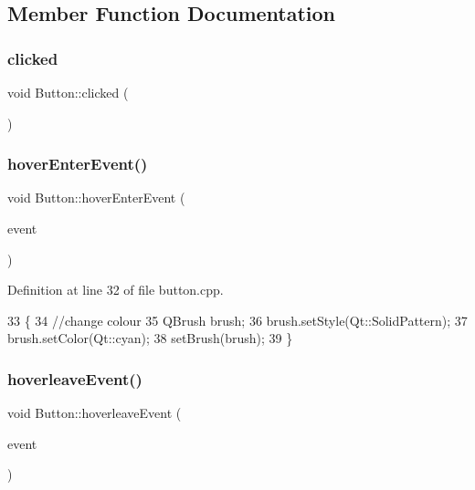 \subsection{Member Function Documentation}
\mbox{\label{class_button_a9e7ab4152cb1e7e3beb7f2842f32670c}} 
\subsubsection{\texorpdfstring{clicked}{clicked}}
{\footnotesize\ttfamily void Button\+::clicked (\begin{DoxyParamCaption}{ }\end{DoxyParamCaption})\hspace{0.3cm}{\ttfamily [signal]}}

\mbox{\label{class_button_a633a9684818bc5d300a622a00064f09c}} 
\subsubsection{\texorpdfstring{hover\+Enter\+Event()}{hoverEnterEvent()}}
{\footnotesize\ttfamily void Button\+::hover\+Enter\+Event (\begin{DoxyParamCaption}\item[{Q\+Graphics\+Scene\+Hover\+Event $\ast$}]{event }\end{DoxyParamCaption})}



Definition at line 32 of file button.\+cpp.


\begin{DoxyCode}
33 \{
34     \textcolor{comment}{//change colour}
35     QBrush brush;
36     brush.setStyle(Qt::SolidPattern);
37     brush.setColor(Qt::cyan);
38     setBrush(brush);
39 \}
\end{DoxyCode}
\mbox{\label{class_button_ac7902a801be3eb542ce86e9c4cf4740d}} 
\subsubsection{\texorpdfstring{hoverleave\+Event()}{hoverleaveEvent()}}
{\footnotesize\ttfamily void Button\+::hoverleave\+Event (\begin{DoxyParamCaption}\item[{Q\+Graphics\+Scene\+Hover\+Event $\ast$}]{event }\end{DoxyParamCaption})}



